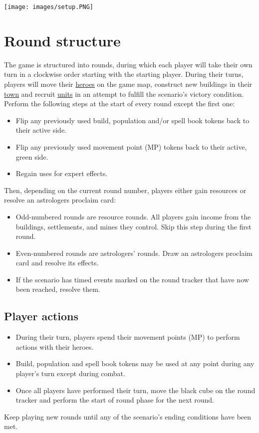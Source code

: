 \documentclass[12pt]{article}
\begin{document}
\clearpage

\begin{center}
\texttt{[image: images/setup.PNG]}
\end{center}

\clearpage

\section{Round structure}
The game is structured into rounds, during which each player will take their own turn in a clockwise order starting with the starting player. During their turns, players will move their \hyperlink{Heroes}{heroes} on the game map, construct new buildings in their \hyperlink{Town}{town} and recruit \hyperlink{Units}{units} in an attempt to fulfill the scenario’s victory condition.\\[6pt]
Perform the following steps at the start of every round except the first one:
\begin{itemize}
\item Flip any previously used build, population and/or spell book tokens back to their active side.
\item Flip any previously used movement point (MP) tokens back to their active, green side.
\item Regain uses for expert effects.
\end{itemize}
Then, depending on the current round number, players either gain resources or resolve an astrologers proclaim card:
\begin{itemize}
\item Odd-numbered rounds are resource rounds. All players gain income from the buildings, settlements, and mines they control. Skip this step during the first round.
\item Even-numbered rounds are astrologers’ rounds. Draw an astrologers proclaim card and resolve its effects.
\item If the scenario has timed events marked on the round tracker that have now been reached, resolve them.
\end{itemize}
\subsection*{Player actions}
\begin{itemize}
\item During their turn, players spend their movement points (MP) to perform actions with their heroes.
\item Build, population and spell book tokens may be used at any point during any player’s turn except during combat.
\item Once all players have performed their turn, move the black cube on the round tracker and perform the start of round phase for the next round.
\end{itemize}
Keep playing new rounds until any of the scenario’s ending conditions have been met.
\end{document}
